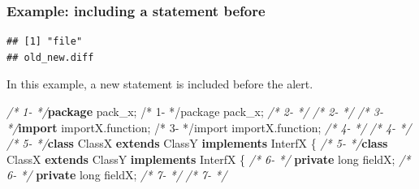 \documentclass[
]{article}
\newenvironment{Shaded}{\begin{snugshade}}{\end{snugshade}}
\newcommand{\CommentTok}[1]{\textcolor[rgb]{0.56,0.35,0.01}{\textit{#1}}}
\newcommand{\DataTypeTok}[1]{\textcolor[rgb]{0.13,0.29,0.53}{#1}}
\newcommand{\ImportTok}[1]{#1}
\newcommand{\KeywordTok}[1]{\textcolor[rgb]{0.13,0.29,0.53}{\textbf{#1}}}
\newcommand{\NormalTok}[1]{#1}
\begin{document}
\begin{landscape}

\subsubsection{Example: including a statement before} \label{example_including_statement}

\small

\begin{verbatim}
## [1] "file"
## old_new.diff
\end{verbatim}

\normalsize

In this example, a new statement is included before the alert.

\scriptsize

\begin{Shaded}
\begin{Highlighting}[]
\CommentTok{/*  1-                 */}\KeywordTok{package}\ImportTok{ pack_x;                                                /*  1-                 */package pack_x;}                                                
\CommentTok{/*  2-                 */}                                                               \CommentTok{/*  2-                 */}                                                               
\CommentTok{/*  3-                 */}\KeywordTok{import}\ImportTok{ importX.function;                                       /*  3-                 */import importX.function;}                                       
\CommentTok{/*  4-                 */}                                                               \CommentTok{/*  4-                 */}                                                               
\CommentTok{/*  5-                 */}\KeywordTok{class}\NormalTok{ ClassX }\KeywordTok{extends}\NormalTok{ ClassY }\KeywordTok{implements}\NormalTok{ InterfX \{               }\CommentTok{/*  5-                 */}\KeywordTok{class}\NormalTok{ ClassX }\KeywordTok{extends}\NormalTok{ ClassY }\KeywordTok{implements}\NormalTok{ InterfX \{               }
\CommentTok{/*  6-                 */}    \KeywordTok{private} \DataTypeTok{long}\NormalTok{ fieldX;                                       }\CommentTok{/*  6-                 */}    \KeywordTok{private} \DataTypeTok{long}\NormalTok{ fieldX;                                       }
\CommentTok{/*  7-                 */}                                                               \CommentTok{/*  7-                 */}                                                               

\end{Highlighting}
\end{Shaded}
\end{landscape}
\end{document}
